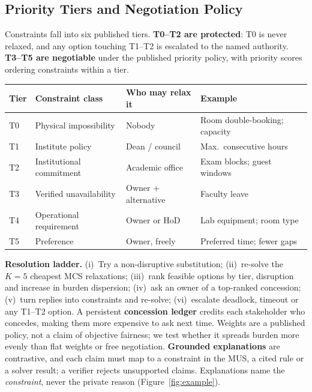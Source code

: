 \documentclass[11pt,a4paper]{article}
\begin{document}
\subsection{Priority Tiers and Negotiation Policy}
Constraints fall into six published
tiers. \textbf{T0--T2 are protected}: T0 is never relaxed, and any option
touching T1--T2 is escalated to the named authority. \textbf{T3--T5 are
negotiable} under the published priority policy, with priority scores
ordering constraints within a tier.
\begin{table}[H]
\centering\small
\begin{tabularx}{\textwidth}{@{}l L{4.6cm} L{3.4cm} Y@{}}
\toprule
\textbf{Tier} & \textbf{Constraint class} & \textbf{Who may relax it} & \textbf{Example}\\
\midrule
T0 & Physical impossibility & Nobody & Room double-booking; capacity\\
T1 & Institute policy & Dean / council & Max.\ consecutive hours\\
T2 & Institutional commitment & Academic office & Exam blocks; guest windows\\
\midrule
T3 & Verified unavailability & Owner + alternative & Faculty leave\\
T4 & Operational requirement & Owner or HoD & Lab equipment; room type\\
T5 & Preference & Owner, freely & Preferred time; fewer gaps\\
\bottomrule
\end{tabularx}
\end{table}
\textbf{Resolution ladder.} (i)~Try a non-disruptive substitution;
(ii)~re-solve the $K{=}5$ cheapest MCS relaxations; (iii)~rank feasible
options by tier, disruption and increase in burden dispersion; (iv)~ask an
owner of a top-ranked concession; (v)~turn replies into constraints and
re-solve; (vi)~escalate deadlock, timeout or any T1--T2 option. A persistent \textbf{concession ledger} credits each stakeholder who
concedes, making them more expensive to ask next time. Weights are a
published policy, not a claim of objective fairness; we test whether it
spreads burden more evenly than flat weights or free negotiation.
\textbf{Grounded explanations} are contrastive, and each claim must map to
a constraint in the MUS, a cited rule or a solver result; a verifier rejects
unsupported claims. Explanations name the \emph{constraint}, never the
private reason (Figure~\ref{fig:example}).
\end{document}
